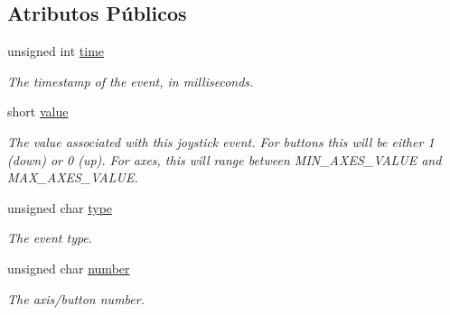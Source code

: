 \subsection*{Atributos Públicos}
\begin{DoxyCompactItemize}
\item 
unsigned int \hyperlink{classJoystickEvent_a5daa361798dd403ff4dd771fca60ede0}{time}\hypertarget{classJoystickEvent_a5daa361798dd403ff4dd771fca60ede0}{}\label{classJoystickEvent_a5daa361798dd403ff4dd771fca60ede0}

\begin{DoxyCompactList}\small\item\em The timestamp of the event, in milliseconds. \end{DoxyCompactList}\item 
short \hyperlink{classJoystickEvent_a52cd09ad823d2eec682657f27485109d}{value}\hypertarget{classJoystickEvent_a52cd09ad823d2eec682657f27485109d}{}\label{classJoystickEvent_a52cd09ad823d2eec682657f27485109d}

\begin{DoxyCompactList}\small\item\em The value associated with this joystick event. For buttons this will be either 1 (down) or 0 (up). For axes, this will range between M\+I\+N\+\_\+\+A\+X\+E\+S\+\_\+\+V\+A\+L\+UE and M\+A\+X\+\_\+\+A\+X\+E\+S\+\_\+\+V\+A\+L\+UE. \end{DoxyCompactList}\item 
unsigned char \hyperlink{classJoystickEvent_ada8aabcfb833ec362a3d8b2502d26951}{type}\hypertarget{classJoystickEvent_ada8aabcfb833ec362a3d8b2502d26951}{}\label{classJoystickEvent_ada8aabcfb833ec362a3d8b2502d26951}

\begin{DoxyCompactList}\small\item\em The event type. \end{DoxyCompactList}\item 
unsigned char \hyperlink{classJoystickEvent_a786468a9d3ad11577fdbd64292d8bc06}{number}\hypertarget{classJoystickEvent_a786468a9d3ad11577fdbd64292d8bc06}{}\label{classJoystickEvent_a786468a9d3ad11577fdbd64292d8bc06}

\begin{DoxyCompactList}\small\item\em The axis/button number. \end{DoxyCompactList}\end{DoxyCompactItemize}
